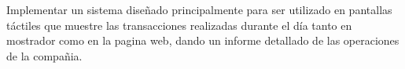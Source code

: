 Implementar un sistema diseñado principalmente para ser utilizado en pantallas táctiles
que muestre las transacciones realizadas durante el día tanto en mostrador como en la pagina web,
dando un informe detallado de las operaciones de la compañia.
